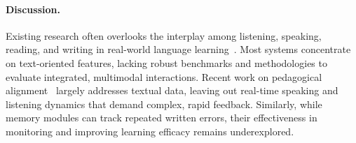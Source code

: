 \paragraph{Discussion.} Existing research often overlooks the interplay among listening, speaking, reading, and writing in real-world language learning~\cite{caines2023application,shetye2024evaluation}. Most systems concentrate on text-oriented features, lacking robust benchmarks and methodologies to evaluate integrated, multimodal interactions. Recent work on pedagogical alignment~\cite{razafinirina2024pedagogical} largely addresses textual data, leaving out real-time speaking and listening dynamics that demand complex, rapid feedback. Similarly, while memory modules can track repeated written errors, their effectiveness in monitoring and improving learning efficacy remains underexplored.




